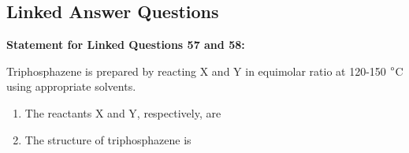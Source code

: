 \documentclass[journal,12pt,onecolumn]{IEEEtran}
\theoremstyle{remark}
\begin{document}
\subsection*{Linked Answer Questions}

\textbf{Statement for Linked Questions 57 and 58:}

Triphosphazene is prepared by reacting X and Y in equimolar ratio at 120-150 $\degree$C using appropriate solvents.
 \begin{enumerate}[resume]
\item The reactants X and Y, respectively, are
    \begin{enumerate}
        \hfill{}
    \end{enumerate}



\item The structure of triphosphazene is
\begin{enumerate}
\end{enumerate}
\hfill{}
\end{enumerate}
\end{document}
